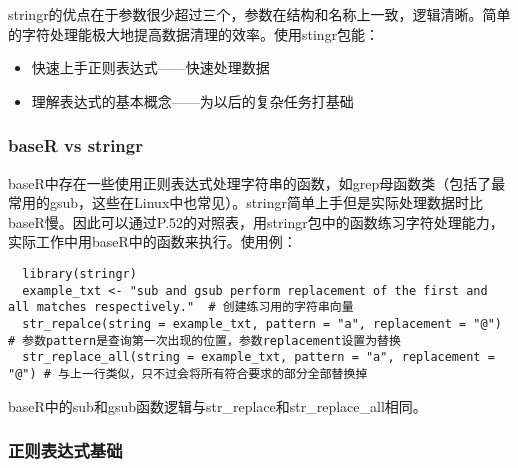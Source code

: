 \documentclass[cn,hazy,blue,14pt,screen]{elegantnote}
\begin{document}
stringr的优点在于参数很少超过三个，参数在结构和名称上一致，逻辑清晰。简单的字符处理能极大地提高数据清理的效率。使用stingr包能：

\begin{itemize}
  \item 快速上手正则表达式——快速处理数据
  \item 理解表达式的基本概念——为以后的复杂任务打基础
\end{itemize}

\subsubsection{baseR vs stringr}

baseR中存在一些使用正则表达式处理字符串的函数，如grep母函数类（包括了最常用的gsub，这些在Linux中也常见）。stringr简单上手但是实际处理数据时比baseR慢。因此可以通过P.52的对照表，用stringr包中的函数练习字符处理能力，实际工作中用baseR中的函数来执行。使用例：

\begin{lstlisting}
  library(stringr)
  example_txt <- "sub and gsub perform replacement of the first and all matches respectively."  # 创建练习用的字符串向量
  str_repalce(string = example_txt, pattern = "a", replacement = "@") # 参数pattern是查询第一次出现的位置，参数replacement设置为替换
  str_replace_all(string = example_txt, pattern = "a", replacement = "@") # 与上一行类似，只不过会将所有符合要求的部分全部替换掉
\end{lstlisting}

baseR中的sub和gsub函数逻辑与str\_replace和str\_replace\_all相同。

\subsubsection{正则表达式基础}
\end{document}
